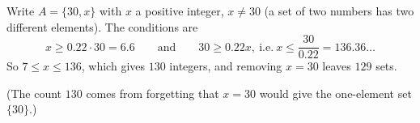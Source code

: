 Write $A=\{30,x\}$ with $x$ a positive integer, $x\ne30$ (a set of two numbers has two different elements). The conditions are
\[x\ge0.22\cdot30=6.6\qquad\text{and}\qquad30\ge0.22x,\ \text{i.e.}\ x\le\dfrac{30}{0.22}=136.36\ldots\]
So $7\le x\le136$, which gives $130$ integers, and removing $x=30$ leaves $\boxed{129}$ sets.

(The count $130$ comes from forgetting that $x=30$ would give the one-element set $\{30\}$.)
